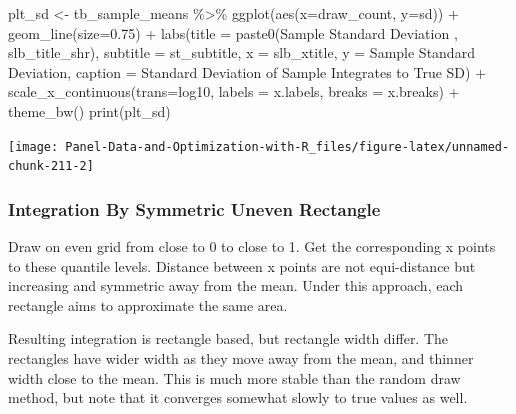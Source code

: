 \documentclass[
]{book}
\newenvironment{Shaded}{\begin{snugshade}}{\end{snugshade}}
\newcommand{\AttributeTok}[1]{\textcolor[rgb]{0.77,0.63,0.00}{#1}}
\newcommand{\FloatTok}[1]{\textcolor[rgb]{0.00,0.00,0.81}{#1}}
\newcommand{\FunctionTok}[1]{\textcolor[rgb]{0.00,0.00,0.00}{#1}}
\newcommand{\NormalTok}[1]{#1}
\newcommand{\OtherTok}[1]{\textcolor[rgb]{0.56,0.35,0.01}{#1}}
\newcommand{\SpecialCharTok}[1]{\textcolor[rgb]{0.00,0.00,0.00}{#1}}
\newcommand{\StringTok}[1]{\textcolor[rgb]{0.31,0.60,0.02}{#1}}
\begin{document}
\begin{Shaded}
\begin{Highlighting}[]
\NormalTok{plt\_sd }\OtherTok{\textless{}{-}}\NormalTok{ tb\_sample\_means }\SpecialCharTok{\%\textgreater{}\%}
  \FunctionTok{ggplot}\NormalTok{(}\FunctionTok{aes}\NormalTok{(}\AttributeTok{x=}\NormalTok{draw\_count, }\AttributeTok{y=}\NormalTok{sd)) }\SpecialCharTok{+}
  \FunctionTok{geom\_line}\NormalTok{(}\AttributeTok{size=}\FloatTok{0.75}\NormalTok{) }\SpecialCharTok{+}
  \FunctionTok{labs}\NormalTok{(}\AttributeTok{title =} \FunctionTok{paste0}\NormalTok{(}\StringTok{\textquotesingle{}Sample Standard Deviation \textquotesingle{}}\NormalTok{, slb\_title\_shr),}
       \AttributeTok{subtitle =}\NormalTok{ st\_subtitle,}
       \AttributeTok{x =}\NormalTok{ slb\_xtitle,}
       \AttributeTok{y =} \StringTok{\textquotesingle{}Sample Standard Deviation\textquotesingle{}}\NormalTok{,}
       \AttributeTok{caption =} \StringTok{\textquotesingle{}Standard Deviation of Sample Integrates to True SD\textquotesingle{}}\NormalTok{) }\SpecialCharTok{+}
  \FunctionTok{scale\_x\_continuous}\NormalTok{(}\AttributeTok{trans=}\StringTok{\textquotesingle{}log10\textquotesingle{}}\NormalTok{, }\AttributeTok{labels =}\NormalTok{ x.labels, }\AttributeTok{breaks =}\NormalTok{ x.breaks) }\SpecialCharTok{+}
  \FunctionTok{theme\_bw}\NormalTok{()}
\FunctionTok{print}\NormalTok{(plt\_sd)}
\end{Highlighting}
\end{Shaded}

\begin{center}\texttt{[image: Panel-Data-and-Optimization-with-R\_files/figure-latex/unnamed-chunk-211-2]} \end{center}

\hypertarget{integration-by-symmetric-uneven-rectangle}{%
\subsubsection{Integration By Symmetric Uneven Rectangle}\label{integration-by-symmetric-uneven-rectangle}}

Draw on even grid from close to 0 to close to 1. Get the corresponding x points to these quantile levels. Distance between x points are not equi-distance but increasing and symmetric away from the mean. Under this approach, each rectangle aims to approximate the same area.

Resulting integration is rectangle based, but rectangle width differ. The rectangles have wider width as they move away from the mean, and thinner width close to the mean. This is much more stable than the random draw method, but note that it converges somewhat slowly to true values as well.
\end{document}
